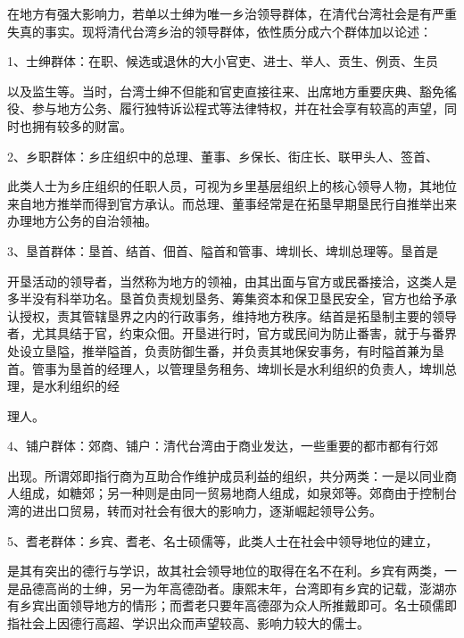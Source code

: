 
\noindent 在地方有强大影响力，若单以士绅为唯一乡治领导群体，在清代台湾社会是有严重失真的事实。现将清代台湾乡治的领导群体，依性质分成六个群体加以论述：

1、士绅群体：在职、候选或退休的大小官吏、进士、举人、贡生、例贡、生员

\begin{BookQuote}
以及监生等。当时，台湾士绅不但能和官吏直接往来、出席地方重要庆典、豁免徭役、参与地方公务、履行独特诉讼程式等法律特权，并在社会享有较高的声望，同时也拥有较多的财富。
\end{BookQuote}

2、乡职群体：乡庄组织中的总理、董事、乡保长、街庄长、联甲头人、签首、

\begin{BookQuote}
此类人士为乡庄组织的任职人员，可视为乡里基层组织上的核心领导人物，其地位来自地方推举而得到官方承认。而总理、董事经常是在拓垦早期垦民行自推举出来办理地方公务的自治领袖。
\end{BookQuote}

3、垦首群体：垦首、结首、佃首、隘首和管事、埤圳长、埤圳总理等。垦首是

\begin{BookQuote}
开垦活动的领导者，当然称为地方的领袖，由其出面与官方或民番接洽，这类人是多半没有科举功名。垦首负责规划垦务、筹集资本和保卫垦民安全，官方也给予承认授权，责其管辖垦界之内的行政事务，维持地方秩序。结首是拓垦制主要的领导者，尤其具结于官，约束众佃。开垦进行时，官方或民间为防止番害，就于与番界处设立垦隘，推举隘首，负责防御生番，并负责其地保安事务，有时隘首兼为垦首。管事为垦首的经理人，以管理垦务租务、埤圳长是水利组织的负责人，埤圳总理，是水利组织的经
\end{BookQuote}

理人。

4、铺户群体：郊商、铺户：清代台湾由于商业发达，一些重要的都市都有行郊

\begin{BookQuote}
出现。所谓郊即指行商为互助合作维护成员利益的组织，共分两类：一是以同业商人组成，如糖郊；另一种则是由同一贸易地商人组成，如泉郊等。郊商由于控制台湾的进出口贸易，转而对社会有很大的影响力，逐渐崛起领导公务。
\end{BookQuote}

5、耆老群体：乡宾、耆老、名士硕儒等，此类人士在社会中领导地位的建立，


\begin{BookQuote}
是其有突出的德行与学识，故其社会领导地位的取得在名不在利。乡宾有两类，一是品德高尚的士绅，另一为年高德劭者。康熙末年，台湾即有乡宾的记载，澎湖亦有乡宾出面领导地方的情形；而耆老只要年高德邵为众人所推戴即可。名士硕儒即指社会上因德行高超、学识出众而声望较高、影响力较大的儒士。
\end{BookQuote}

